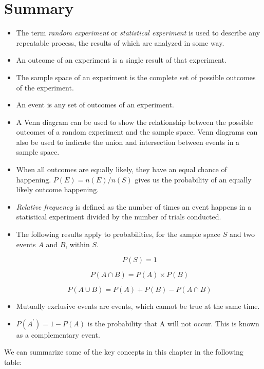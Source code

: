             \section{ Summary}
            \nopagebreak
            \label{m39373*eip-106}\begin{itemize}[noitemsep]
            \item The
term \textsl{random experiment} or \textsl{statistical experiment} is used to describe any
repeatable process, the results of which are analyzed in some way.\item 
An outcome of an experiment is a single result of that experiment.\item 
The sample space of an experiment is the complete set of possible outcomes of
the experiment.\item 
An event is any set of outcomes of an experiment.\item 
A Venn diagram can be used to show the relationship between the possible
outcomes of a random experiment and the sample space. Venn diagrams can also be
used to indicate the union and intersection between events in a sample space.
\item 
When all outcomes are equally likely, they have an equal chance of happening.
$P\left(E\right)=n\left(E\right)/n\left(S\right)$ gives us the
probability of an equally likely outcome happening.\item 
\textsl{Relative frequency} is defined as the
number of times an event happens in a statistical experiment divided by the
number of trials conducted.\item The following results apply to probabilities, for the sample space $S$ and two events $A$ and $B$, within $S$.
      \label{m39373*uid3457}\nopagebreak\noindent{}
        
    \begin{equation}
    P\left(S\right)=1\tag{11.12}
      \end{equation}
      \label{m39373*uid5853}\nopagebreak\noindent{}
        
    \begin{equation}
    P\left(A\cap B\right)=P\left(A\right)\ensuremath{\times}P\left(B\right)\tag{11.13}
      \end{equation}
      \label{m39373*uid4559}\nopagebreak\noindent{}
        
    \begin{equation}
    P\left(A\cup B\right)=P\left(A\right)+P\left(B\right)-P\left(A\cap B\right)\tag{11.14}
      \end{equation}
\item 
Mutually exclusive events are events, which cannot be true at the same
time.\item 
$P\left({A}^{\text{'}}\right)=1-P\left(A\right)$ is the probability that A will not occur. This is known as a
complementary event.\end{itemize}
        \label{m39373*eip-199}We can summarize some of the key concepts in this chapter in the following table:\par 
